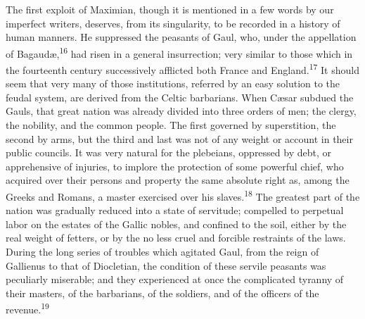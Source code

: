 The first exploit of Maximian, though it is mentioned in a few
words by our imperfect writers, deserves, from its singularity,
to be recorded in a history of human manners. He suppressed the
peasants of Gaul, who, under the appellation of Bagaudæ,\textsuperscript{16} had
risen in a general insurrection; very similar to those which in
the fourteenth century successively afflicted both France and
England.\textsuperscript{17} It should seem that very many of those institutions,
referred by an easy solution to the feudal system, are derived
from the Celtic barbarians. When Cæsar subdued the Gauls, that
great nation was already divided into three orders of men; the
clergy, the nobility, and the common people. The first governed
by superstition, the second by arms, but the third and last was
not of any weight or account in their public councils. It was
very natural for the plebeians, oppressed by debt, or
apprehensive of injuries, to implore the protection of some
powerful chief, who acquired over their persons and property the
same absolute right as, among the Greeks and Romans, a master
exercised over his slaves.\textsuperscript{18} The greatest part of the nation was
gradually reduced into a state of servitude; compelled to
perpetual labor on the estates of the Gallic nobles, and confined
to the soil, either by the real weight of fetters, or by the no
less cruel and forcible restraints of the laws. During the long
series of troubles which agitated Gaul, from the reign of
Gallienus to that of Diocletian, the condition of these servile
peasants was peculiarly miserable; and they experienced at once
the complicated tyranny of their masters, of the barbarians, of
the soldiers, and of the officers of the revenue.\textsuperscript{19}





